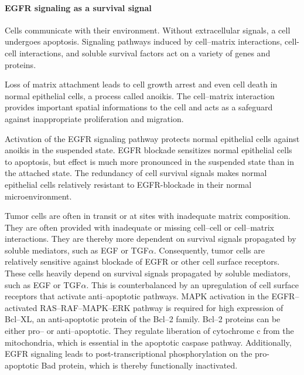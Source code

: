 {{{      \paragraph{EGFR signaling as a survival signal}

        Cells communicate with their environment. Without extracellular signals,
        a cell undergoes apoptosis. Signaling pathways induced by cell--matrix
        interactions, cell-cell interactions, and soluble survival factors act
        on a variety of genes and proteins.

        Loss of matrix attachment leads to cell growth arrest and even cell
        death in normal epithelial cells, a process called anoikis. The
        cell--matrix interaction provides important spatial informations to the
        cell and acts as a safeguard against inappropriate proliferation and
        migration.

        Activation of the EGFR signaling pathway protects normal
        epithelial cells against anoikis in the suspended state. EGFR blockade
        sensitizes normal epithelial cells to apoptosis, but effect is much
        more pronounced in the suspended state than in the attached state. The
        redundancy of cell survival signals makes normal epithelial cells
        relatively resistant to EGFR-blockade in their normal microenvironment.

        Tumor cells are often in transit or at sites with inadequate matrix
        composition. They are often provided with inadequate or missing
        cell--cell or cell--matrix interactions. They are thereby more dependent
        on survival signals propagated by soluble mediators, such as EGF or
        TGF$\alpha$. Consequently, tumor cells are relatively sensitive against
        blockade of EGFR or other cell surface receptors. These cells heavily
        depend on survival signals propagated by soluble mediators, such as EGF
        or TGF$\alpha$. This is counterbalanced by an upregulation of cell
        surface receptors that activate anti--apoptotic pathways. MAPK
        activation in the EGFR--activated RAS--RAF--MAPK--ERK pathway is
        required for high expression of Bcl--XL, an anti-apoptotic protein of
        the Bcl--2 family. Bcl--2 proteins can be either pro-- or
        anti--apoptotic. They regulate liberation of cytochrome c from the
        mitochondria, which is essential in the apoptotic caspase pathway.
        Additionally, EGFR signaling leads to post-transcriptional
        phosphorylation on the pro-apoptotic Bad protein, which is thereby
        functionally inactivated.

}}}
